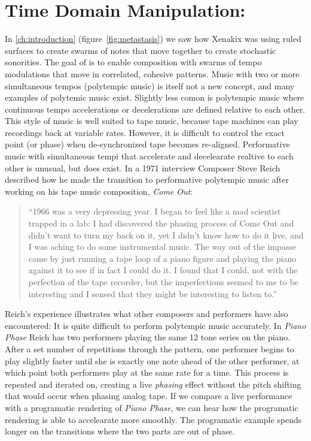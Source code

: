 
\chapter{Time Domain Manipulation: \polytempic}
\label{ch:polytempic}
In \autoref{ch:introduction} (figure~\ref{fig:metastasis}) we saw how
Xenakix was using ruled surfaces to create swarms of notes that move
together to create stochastic sonorities. The goal of \polytempic is
to enable composition with swarms of tempo modulations that move in
correlated, cohesive patterns. Music with two or more simultaneous
tempos (polytempic music) is itself not a new concept, and many
examples of polytemic music exist\cite{Greschak2003}. Slightly less
comon is polytempic music where continuous tempo accelerations or
decelerations are defined relative to each other.  This style of music
is well suited to tape music, because tape machines can play
recordings back at variable rates. However, it is difficult to control
the exact point (or phase) when de-synchronized tape becomes
re-aligned. Performative music with simultaneous tempi that accelerate
and decelearate realtive to each other is unusual, but does exist. In
a 1971 interview Composer Steve Reich described how he made the
transition to performative polytempic music after working on his tape
music composition, \textit{Come Out}:
\begin{quotation}
  ``1966 was a very depressing year. I began to feel like a mad
  scientist trapped in a lab: I had discovered the phasing process
  of Come Out and didn't want to turn my back on it, yet I didn't know
  how to do it live, and I was aching to do some instrumental
  music. The way out of the impasse came by just running a tape loop
  of a piano figure and playing the piano against it to see if in fact
  I could do it. I found that I could, not with the perfection of the
  tape recorder, but the imperfections seemed to me to be interesting
  and I sensed that they might be interesting to listen to.''\cite{Nyman2015}
\end{quotation}
Reich's experience illustrates what other composers and performers
have also encountered: It is quite difficult to perform polytempic
music accurately. In \textit{Piano Phase} Reich has two performers
playing the same 12 tone series on the piano. After a set number of
repetitions through the pattern, one performer begins to play slightly
faster until she is exactly one note ahead of the other performer, at
which point both performers play at the same rate for a time. This
process is repeated and iterated on, creating a live \emph{phasing}
effect without the pitch shifting that would occur when phasing analog
tape. If we compare a live performance\cite{Huisman1989} with a
programatic rendering\cite{Chen2014} of \textit{Piano Phase}, we can
hear how the programatic rendering is able to accelearate more
smoothly. The programatic example spends longer on the transitions
where the two parts are out of phase.

